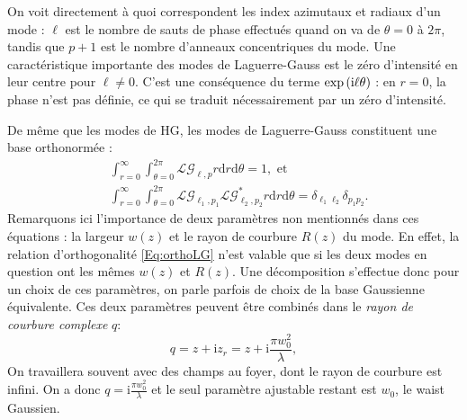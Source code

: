 On voit directement à quoi correspondent les index azimutaux et radiaux d'un mode : $\ell$ est le nombre de sauts de phase effectués quand on va de $\theta = 0$ à $2\pi$, tandis que $p+1$ est le nombre d'anneaux concentriques du mode.  Une caractéristique importante des modes de Laguerre-Gauss est le zéro d'intensité en leur centre pour $\ell \neq 0$. C'est une conséquence du terme $\exp{({\mathrm{i}}\ell \theta )}$ : en $r=0$, la phase n'est pas définie, ce qui se traduit nécessairement par un zéro d'intensité. 

De même que les modes de HG, les modes de Laguerre-Gauss constituent une base orthonormée : 
\begin{align}
&\int_{r=0}^{\infty}\int_{\theta=0}^{2\pi}{\mathcal{LG}_{\ell,p} r\mathrm{d}r\mathrm{d}\theta} = 1, \mbox{ et}\nonumber\\ 
&\int_{r=0}^{\infty}\int_{\theta=0}^{2\pi}{\mathcal{LG}_{\ell_1,p_1} \mathcal{LG}^{*}_{\ell_2,p_2} r\mathrm{d}r\mathrm{d}\theta} = \delta_{\ell_1\ell_2}\delta_{p_1p_2}.
\label{Eq:orthoLG}
\end{align}
Remarquons ici l'importance de deux paramètres non mentionnés dans ces équations : la largeur $w(z)$ et le rayon de courbure $R(z)$ du mode. En effet, la relation d'orthogonalité \ref{Eq:orthoLG} n'est valable que si les deux modes en question ont les mêmes $w(z)$ et $R(z)$. Une décomposition s'effectue donc pour un choix de ces paramètres, on parle parfois de choix de la base Gaussienne équivalente. Ces deux paramètres peuvent être combinés dans le \textit{rayon de courbure complexe} $q$:
\begin{equation}
q = z + \mathrm{i}z_r = z + \mathrm{i}\frac{\pi w_0^2}{\lambda},
\end{equation}
On travaillera souvent avec des champs au foyer, dont le rayon de courbure est infini. On a donc $q = \mathrm{i}\frac{\pi w_0^2}{\lambda}$ et le seul paramètre ajustable restant est $w_0$, le waist Gaussien.

